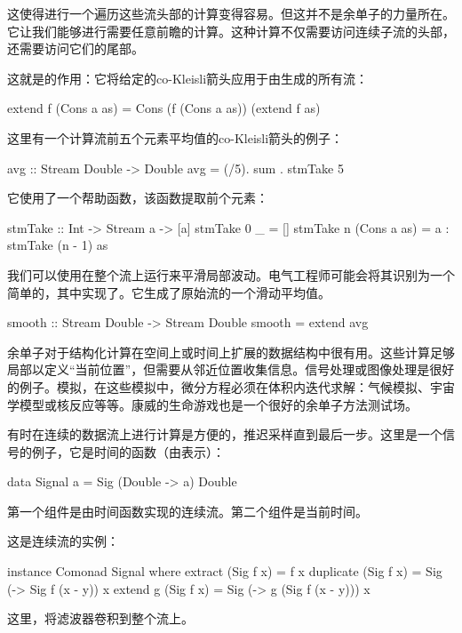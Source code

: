 \documentclass[DaoFP]{subfiles}
\begin{document}
    这使得进行一个遍历这些流头部的计算变得容易。但这并不是余单子的力量所在。它让我们能够进行需要任意前瞻的计算。这种计算不仅需要访问连续子流的头部，还需要访问它们的尾部。

    这就是的作用：它将给定的co-Kleisli箭头应用于由生成的所有流：
    \begin{haskell}
        extend f (Cons a as) = Cons (f (Cons a as)) (extend f as)
    \end{haskell}

    这里有一个计算流前五个元素平均值的co-Kleisli箭头的例子：
    \begin{haskell}
        avg :: Stream Double -> Double
        avg  = (/5). sum . stmTake 5
    \end{haskell}
    它使用了一个帮助函数，该函数提取前个元素：
    \begin{haskell}
        stmTake :: Int -> Stream a -> [a]
        stmTake 0 _ = []
        stmTake n (Cons a as) = a : stmTake (n - 1) as
    \end{haskell}

    我们可以使用在整个流上运行来平滑局部波动。电气工程师可能会将其识别为一个简单的，其中实现了。它生成了原始流的一个滑动平均值。
    \begin{haskell}
        smooth :: Stream Double -> Stream Double
        smooth = extend avg
    \end{haskell}

    余单子对于结构化计算在空间上或时间上扩展的数据结构中很有用。这些计算足够局部以定义“当前位置”，但需要从邻近位置收集信息。信号处理或图像处理是很好的例子。模拟，在这些模拟中，微分方程必须在体积内迭代求解：气候模拟、宇宙学模型或核反应等等。康威的生命游戏也是一个很好的余单子方法测试场。

    有时在连续的数据流上进行计算是方便的，推迟采样直到最后一步。这里是一个信号的例子，它是时间的函数（由表示）：
    \begin{haskell}
        data Signal a = Sig (Double -> a) Double
    \end{haskell}
    第一个组件是由时间函数实现的连续流。第二个组件是当前时间。

    这是连续流的实例：
    \begin{haskell}
        instance Comonad Signal where
        extract (Sig f x) = f x
        duplicate (Sig f x) = Sig (\y -> Sig f (x - y)) x
        extend g (Sig f x) = Sig (\y -> g (Sig f (x - y))) x
    \end{haskell}
    这里，将滤波器卷积到整个流上。
\end{document}
